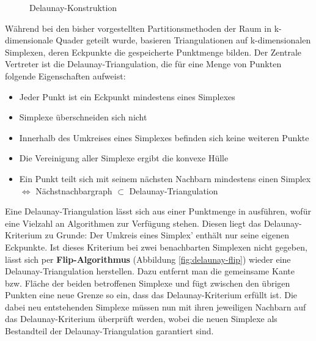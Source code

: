 \begin{figure}[bhpt]
  \centering
  \def\svgwidth{\textwidth}
  
  \caption[Delaunay-Konstruktion]{Delaunay-Konstruktion}
  \label{fig:delaunay}
\end{figure}

Während bei den bisher vorgestellten Partitionsmethoden der Raum in k-dimensionale Quader geteilt wurde, basieren Triangulationen auf k-dimensionalen Simplexen, deren Eckpunkte die gespeicherte Punktmenge bilden.
Der Zentrale Vertreter ist die Delaunay-Triangulation, die für eine Menge von Punkten folgende Eigenschaften aufweist:

\begin{itemize}
\item Jeder Punkt ist ein Eckpunkt mindestens eines Simplexes
\item Simplexe überschneiden sich nicht
\item Innerhalb des Umkreises eines Simplexes befinden sich keine weiteren Punkte
\item Die Vereinigung aller Simplexe ergibt die konvexe Hülle
\item Ein Punkt teilt sich mit seinem nächsten Nachbarn mindestens einen Simplex \\
$\Leftrightarrow$ Nächstnachbargraph $\subset$ Delaunay-Triangulation
\end{itemize}

Eine Delaunay-Triangulation lässt sich aus einer Punktmenge in  ausführen, wofür eine Vielzahl an Algorithmen zur Verfügung stehen. 
Diesen liegt das Delaunay-Kriterium zu Grunde:
Der Umkreis eines Simplex' enthält nur seine eigenen Eckpunkte.
Ist dieses Kriterium bei zwei benachbarten Simplexen nicht gegeben, lässt sich per \textbf{Flip-Algorithmus} (Abbildung \ref{fig:delaunay-flip}) wieder eine Delaunay-Triangulation herstellen.
Dazu entfernt man die gemeinsame Kante bzw. Fläche der beiden betroffenen Simplexe und fügt zwischen den übrigen Punkten eine neue Grenze so ein, dass das Delaunay-Kriterium erfüllt ist.
Die dabei neu entstehenden Simplexe müssen nun mit ihren jeweiligen Nachbarn auf das Delaunay-Kriterium überprüft werden, wobei die neuen Simplexe als Bestandteil der Delaunay-Triangulation garantiert sind.


